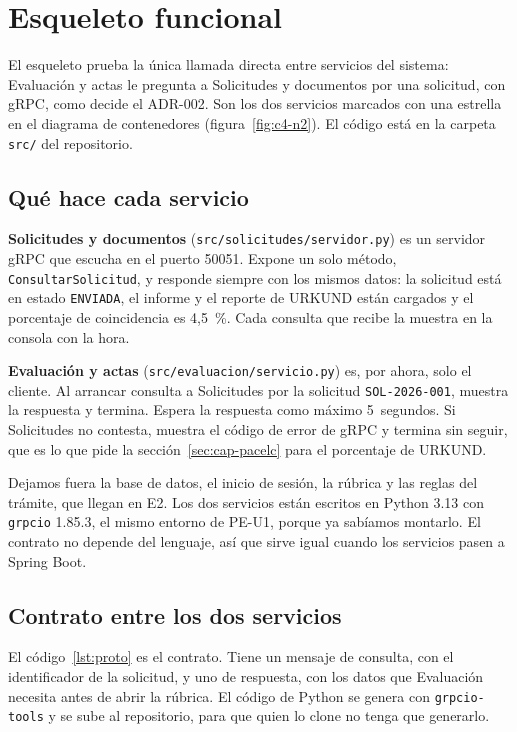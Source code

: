 \section{Esqueleto funcional}
\label{sec:esqueleto}

El esqueleto prueba la única llamada directa entre servicios del sistema: Evaluación y actas le pregunta a Solicitudes y documentos por una solicitud, con gRPC, como decide el ADR-002. Son los dos servicios marcados con una estrella en el diagrama de contenedores (figura~\ref{fig:c4-n2}). El código está en la carpeta \nolinkurl{src/} del repositorio.

\subsection{Qué hace cada servicio}

\textbf{Solicitudes y documentos} (\nolinkurl{src/solicitudes/servidor.py}) es un servidor gRPC que escucha en el puerto 50051. Expone un solo método, \texttt{ConsultarSolicitud}, y responde siempre con los mismos datos: la solicitud está en estado \texttt{ENVIADA}, el informe y el reporte de URKUND están cargados y el porcentaje de coincidencia es 4,5~\%. Cada consulta que recibe la muestra en la consola con la hora.

\textbf{Evaluación y actas} (\nolinkurl{src/evaluacion/servicio.py}) es, por ahora, solo el cliente. Al arrancar consulta a Solicitudes por la solicitud \texttt{SOL-2026-001}, muestra la respuesta y termina. Espera la respuesta como máximo 5~segundos. Si Solicitudes no contesta, muestra el código de error de gRPC y termina sin seguir, que es lo que pide la sección~\ref{sec:cap-pacelc} para el porcentaje de URKUND.

Dejamos fuera la base de datos, el inicio de sesión, la rúbrica y las reglas del trámite, que llegan en E2. Los dos servicios están escritos en Python 3.13 con \texttt{grpcio} 1.85.3, el mismo entorno de PE-U1, porque ya sabíamos montarlo. El contrato no depende del lenguaje, así que sirve igual cuando los servicios pasen a Spring Boot.

\subsection{Contrato entre los dos servicios}

El código~\ref{lst:proto} es el contrato. Tiene un mensaje de consulta, con el identificador de la solicitud, y uno de respuesta, con los datos que Evaluación necesita antes de abrir la rúbrica. El código de Python se genera con \texttt{grpcio-tools} y se sube al repositorio, para que quien lo clone no tenga que generarlo.

